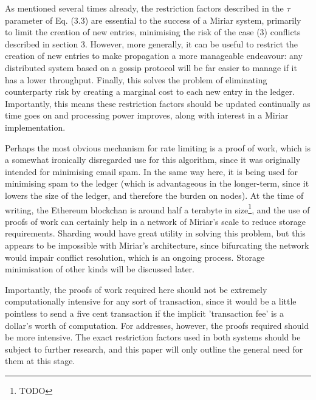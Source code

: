 \documentclass{extreport}
\begin{document}
As mentioned several times already, the restriction factors described in the \(\tau\) parameter of Eq. (3.3) are essential to the success of a Miriar system, primarily to limit the creation of new entries, minimising the risk of the case (3) conflicts described in section 3. However, more generally, it can be useful to restrict the creation of new entries to make propagation a more manageable endeavour: any distributed system based on a gossip protocol will be far easier to manage if it has a lower throughput. Finally, this solves the problem of eliminating counterparty risk by creating a marginal cost to each new entry in the ledger. Importantly, this means these restriction factors should be updated continually as time goes on and processing power improves, along with interest in a Miriar implementation.

Perhaps the most obvious mechanism for rate limiting is a proof of work, which is a somewhat ironically disregarded use for this algorithm, since it was originally intended for minimising email spam. In the same way here, it is being used for minimising spam to the ledger (which is advantageous in the longer-term, since it lowers the size of the ledger, and therefore the burden on nodes). At the time of writing, the Ethereum blockchan is around half a terabyte in size\footnote{TODO}, and the use of proofs of work can certainly help in a network of Miriar's scale to reduce storage requirements. Sharding would have great utility in solving this problem, but this appears to be impossible with Miriar's architecture, since bifurcating the network would impair conflict resolution, which is an ongoing process. Storage minimisation of other kinds will be discussed later.

Importantly, the proofs of work required here should not be extremely computationally intensive for any sort of transaction, since it would be a little pointless to send a five cent transaction if the implicit 'transaction fee' is a dollar's worth of computation. For addresses, however, the proofs required should be more intensive. The exact restriction factors used in both systems should be subject to further research, and this paper will only outline the general need for them at this stage.
\end{document}
